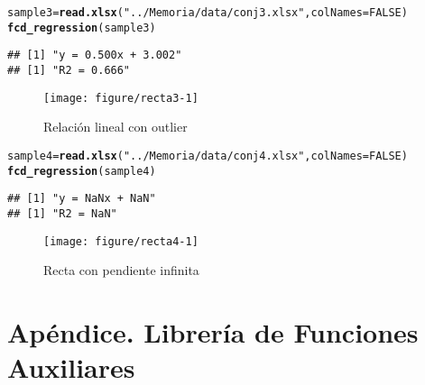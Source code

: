 \documentclass[12pt]{report}\usepackage[]{graphicx}\usepackage[dvipsnames]{xcolor}
\makeatletter
\def\maxwidth{ %
  \ifdim\Gin@nat@width>\linewidth
    \linewidth
  \else
    \Gin@nat@width
  \fi
}
\newcommand{\hlnum}[1]{\textcolor[rgb]{0.686,0.059,0.569}{#1}}%
\newcommand{\hlstr}[1]{\textcolor[rgb]{0.192,0.494,0.8}{#1}}%
\newcommand{\hlstd}[1]{\textcolor[rgb]{0.345,0.345,0.345}{#1}}%
\newcommand{\hlkwb}[1]{\textcolor[rgb]{0.69,0.353,0.396}{#1}}%
\newcommand{\hlkwc}[1]{\textcolor[rgb]{0.333,0.667,0.333}{#1}}%
\newcommand{\hlkwd}[1]{\textcolor[rgb]{0.737,0.353,0.396}{\textbf{#1}}}%
\newenvironment{kframe}{%
 \def\at@end@of@kframe{}%
 \ifinner\ifhmode%
  \def\at@end@of@kframe{\end{minipage}}%
  \begin{minipage}{\columnwidth}%
 \fi\fi%
 \def\FrameCommand##1{\hskip\@totalleftmargin \hskip-\fboxsep
 \colorbox{shadecolor}{##1}\hskip-\fboxsep
     \hskip-\linewidth \hskip-\@totalleftmargin \hskip\columnwidth}%
 \MakeFramed {\advance\hsize-\width
   \@totalleftmargin\z@ \linewidth\hsize
   \@setminipage}}%
 {\par\unskip\endMakeFramed%
 \at@end@of@kframe}
\newenvironment{knitrout}{}{} %
\makeatother
\begin{document}
\begin{knitrout}
\color{fgcolor}\begin{kframe}
\begin{alltt}
\hlstd{sample3} \hlkwb{=} \hlkwd{read.xlsx}\hlstd{(}\hlstr{"../Memoria/data/conj3.xlsx"}\hlstd{,} \hlkwc{colNames}\hlstd{=}\hlnum{FALSE}\hlstd{)}
\hlkwd{fcd_regression}\hlstd{(sample3)}
\end{alltt}
\begin{verbatim}
## [1] "y = 0.500x + 3.002"
## [1] "R2 = 0.666"
\end{verbatim}
\end{kframe}\begin{figure}

{\centering \texttt{[image: figure/recta3-1]} 

}

\caption[Relación lineal con outlier]{Relación lineal con outlier}\label{fig:recta3}
\end{figure}

\end{knitrout}
 				
\begin{knitrout}
\color{fgcolor}\begin{kframe}
\begin{alltt}
\hlstd{sample4} \hlkwb{=} \hlkwd{read.xlsx}\hlstd{(}\hlstr{"../Memoria/data/conj4.xlsx"}\hlstd{,} \hlkwc{colNames}\hlstd{=}\hlnum{FALSE}\hlstd{)}
\hlkwd{fcd_regression}\hlstd{(sample4)}
\end{alltt}
\begin{verbatim}
## [1] "y = NaNx + NaN"
## [1] "R2 = NaN"
\end{verbatim}


{\ttfamily\noindent\bfseries\color{errorcolor}{\#\# Error in int\_abline(a = a, b = b, h = h, v = v, untf = untf, ...): 'a' y 'b' deben ser finitos}}\end{kframe}\begin{figure}

{\centering \texttt{[image: figure/recta4-1]} 

}

\caption[Recta con pendiente infinita]{Recta con pendiente infinita}\label{fig:recta4}
\end{figure}

\end{knitrout}
 	\appendix
 	\chapter{Apéndice. Librería de Funciones Auxiliares}
 	
\end{document}
